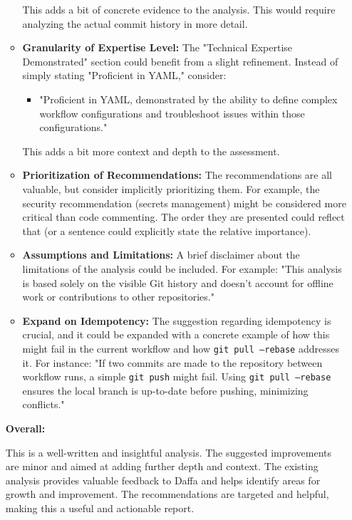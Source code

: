 \documentclass{article}
\begin{document}
\begin{itemize}
\begin{itemize}
     This adds a bit of concrete evidence to the analysis. This would require analyzing the actual commit history in more detail.

    \item \textbf{Granularity of Expertise Level:}\textit{} The "Technical Expertise Demonstrated" section could benefit from a slight refinement. Instead of simply stating "Proficient in YAML," consider:
    \begin{itemize}
        \item   "Proficient in YAML, demonstrated by the ability to define complex workflow configurations and troubleshoot issues within those configurations."
    \end{itemize}

    This adds a bit more context and depth to the assessment.

   \item \textbf{Prioritization of Recommendations:} The recommendations are all valuable, but consider implicitly prioritizing them. For example, the security recommendation (secrets management) might be considered more critical than code commenting. The order they are presented could reflect that (or a sentence could explicitly state the relative importance).

    \item \textbf{Assumptions and Limitations:}\textit{} A brief disclaimer about the limitations of the analysis could be included. For example: "This analysis is based solely on the visible Git history and doesn't account for offline work or contributions to other repositories."

    \item \textbf{Expand on Idempotency:}\textit{} The suggestion regarding idempotency is crucial, and it could be expanded with a concrete example of how this might fail in the current workflow and how \texttt{git pull --rebase} addresses it. For instance: "If two commits are made to the repository between workflow runs, a simple \texttt{git push} might fail. Using \texttt{git pull --rebase} ensures the local branch is up-to-date before pushing, minimizing conflicts."
\end{itemize}

\textbf{Overall:}

This is a well-written and insightful analysis. The suggested improvements are minor and aimed at adding further depth and context. The existing analysis provides valuable feedback to Daffa and helps identify areas for growth and improvement. The recommendations are targeted and helpful, making this a useful and actionable report.


\end{itemize}
\end{document}
